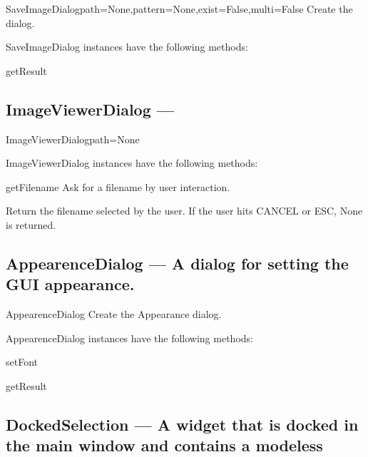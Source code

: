 \begin{classdesc}{SaveImageDialog}{path=None,pattern=None,exist=False,multi=False}
Create the dialog.
\end{classdesc}

SaveImageDialog instances have the following methods:

\begin{funcdesc}{getResult}{}

\end{funcdesc}

\subsection{ImageViewerDialog --- }


\begin{classdesc}{ImageViewerDialog}{path=None}

\end{classdesc}

ImageViewerDialog instances have the following methods:

\begin{funcdesc}{getFilename}{}
Ask for a filename by user interaction.

        Return the filename selected by the user.
        If the user hits CANCEL or ESC, None is returned.
        
\end{funcdesc}

\subsection{AppearenceDialog --- A dialog for setting the GUI appearance.}


\begin{classdesc}{AppearenceDialog}{}
Create the Appearance dialog.
\end{classdesc}

AppearenceDialog instances have the following methods:

\begin{funcdesc}{setFont}{}

\end{funcdesc}

\begin{funcdesc}{getResult}{}

\end{funcdesc}

\subsection{DockedSelection --- A widget that is docked in the main window and contains a modeless}
    

